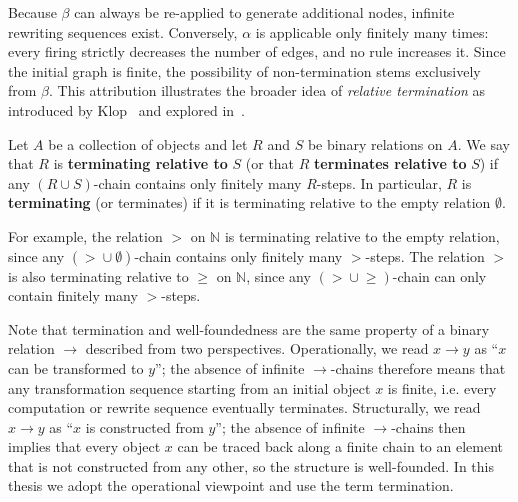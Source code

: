 \begin{center}
{{
            }
        }
            \end{center}
Because $\beta$ can always be re-applied to generate additional nodes, infinite rewriting sequences exist. Conversely, $\alpha$ is applicable only finitely many times: every firing strictly decreases the number of edges, and no rule increases it. Since the initial graph is finite, the possibility of non-termination stems exclusively from $\beta$. This attribution illustrates the broader idea of \emph{relative termination} as introduced by Klop~\cite{klop1987term} and explored in~\cite{geser1990relative,kassing2024dependency,endrullis2024generalized_icgt,zantema2014termination,bruggink2014termination,bruggink2015proving}.
\begin{definition}
Let $A$ be a collection of objects and let $R$ and $S$ be binary relations on $A$. 
We say that $R$ is \textbf{terminating relative to} $S$ (or that $R$ \textbf{terminates relative to} $S$) if 
any $(R \mathop{\cup} S)$-chain contains only finitely many $R$-steps.
In particular, $R$ is \textbf{terminating} (or terminates) if it is terminating relative to the empty relation $\emptyset$.
\end{definition}

For example, the relation $>$ on $\mathbb{N}$ is terminating relative to the empty relation, since any $(\mathop{>} \mathop{\cup} \emptyset)$-chain contains only finitely many $>$-steps. The relation $>$ is also terminating relative to $\geq$ on $\mathbb{N}$, since any $(\mathop{>} \mathop{\cup} \mathop{\geq})$-chain can only contain finitely many $>$-steps. 

Note that termination and well-foundedness are the same property of a binary relation $\to$ described from two perspectives. Operationally, we read $x \mathop{\to} y$ as \enquote{$x$ can be transformed to $y$}; the absence of infinite $\rightarrow$-chains therefore means that any transformation sequence starting from an initial object $x$ is finite, i.e. every computation or rewrite sequence eventually terminates. Structurally, we read $x \mathop{\to} y$ as \enquote{$x$ is constructed from $y$}; the absence of infinite $\to$-chains then implies that every object $x$ can be traced back along a finite chain to an element that is not constructed from any other, so the structure is well-founded. In this thesis we adopt the operational viewpoint and use the term termination.

